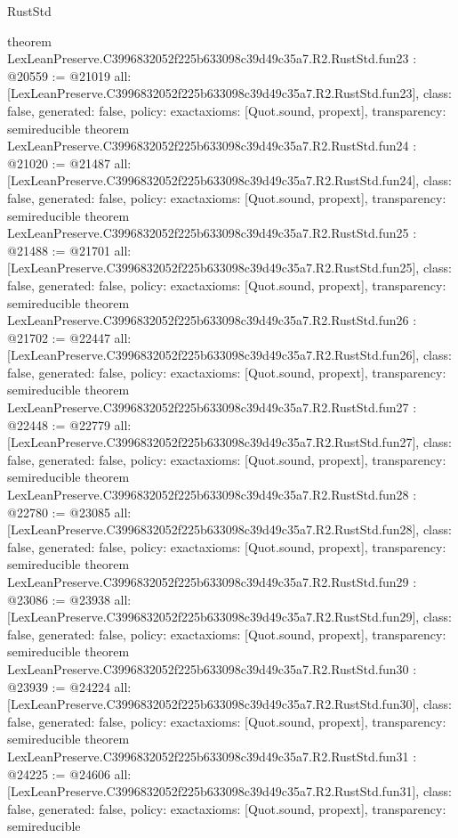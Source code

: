 \begin{lexlean}{RustStd}
\begin{coremodule}
{}
theorem LexLeanPreserve.C3996832052f225b633098c39d49c35a7.R2.RustStd.fun23 : @20559 := @21019 {
  all: [LexLeanPreserve.C3996832052f225b633098c39d49c35a7.R2.RustStd.fun23],
  class: false,
  generated: false,
  policy: exact{axioms: [Quot.sound, propext]},
  transparency: semireducible
}
theorem LexLeanPreserve.C3996832052f225b633098c39d49c35a7.R2.RustStd.fun24 : @21020 := @21487 {
  all: [LexLeanPreserve.C3996832052f225b633098c39d49c35a7.R2.RustStd.fun24],
  class: false,
  generated: false,
  policy: exact{axioms: [Quot.sound, propext]},
  transparency: semireducible
}
theorem LexLeanPreserve.C3996832052f225b633098c39d49c35a7.R2.RustStd.fun25 : @21488 := @21701 {
  all: [LexLeanPreserve.C3996832052f225b633098c39d49c35a7.R2.RustStd.fun25],
  class: false,
  generated: false,
  policy: exact{axioms: [Quot.sound, propext]},
  transparency: semireducible
}
theorem LexLeanPreserve.C3996832052f225b633098c39d49c35a7.R2.RustStd.fun26 : @21702 := @22447 {
  all: [LexLeanPreserve.C3996832052f225b633098c39d49c35a7.R2.RustStd.fun26],
  class: false,
  generated: false,
  policy: exact{axioms: [Quot.sound, propext]},
  transparency: semireducible
}
theorem LexLeanPreserve.C3996832052f225b633098c39d49c35a7.R2.RustStd.fun27 : @22448 := @22779 {
  all: [LexLeanPreserve.C3996832052f225b633098c39d49c35a7.R2.RustStd.fun27],
  class: false,
  generated: false,
  policy: exact{axioms: [Quot.sound, propext]},
  transparency: semireducible
}
theorem LexLeanPreserve.C3996832052f225b633098c39d49c35a7.R2.RustStd.fun28 : @22780 := @23085 {
  all: [LexLeanPreserve.C3996832052f225b633098c39d49c35a7.R2.RustStd.fun28],
  class: false,
  generated: false,
  policy: exact{axioms: [Quot.sound, propext]},
  transparency: semireducible
}
theorem LexLeanPreserve.C3996832052f225b633098c39d49c35a7.R2.RustStd.fun29 : @23086 := @23938 {
  all: [LexLeanPreserve.C3996832052f225b633098c39d49c35a7.R2.RustStd.fun29],
  class: false,
  generated: false,
  policy: exact{axioms: [Quot.sound, propext]},
  transparency: semireducible
}
theorem LexLeanPreserve.C3996832052f225b633098c39d49c35a7.R2.RustStd.fun30 : @23939 := @24224 {
  all: [LexLeanPreserve.C3996832052f225b633098c39d49c35a7.R2.RustStd.fun30],
  class: false,
  generated: false,
  policy: exact{axioms: [Quot.sound, propext]},
  transparency: semireducible
}
theorem LexLeanPreserve.C3996832052f225b633098c39d49c35a7.R2.RustStd.fun31 : @24225 := @24606 {
  all: [LexLeanPreserve.C3996832052f225b633098c39d49c35a7.R2.RustStd.fun31],
  class: false,
  generated: false,
  policy: exact{axioms: [Quot.sound, propext]},
  transparency: semireducible
}
\end{coremodule}
\end{lexlean}
